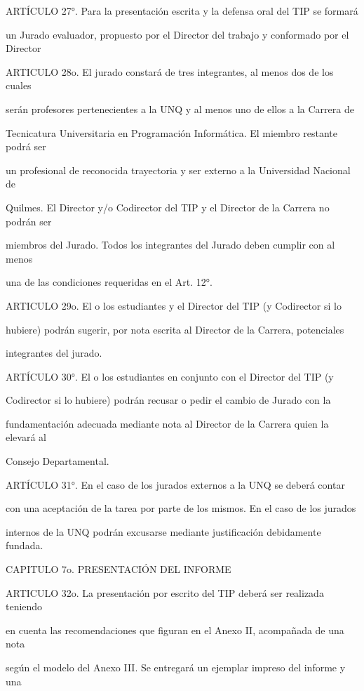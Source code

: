 \documentclass[a4paper,12pt]{article}
\begin{document}
ARTÍCULO 27°. Para la presentación escrita y la defensa oral del TIP se formará

un Jurado evaluador, propuesto por el Director del trabajo y conformado por el Director

ARTICULO 28o. El jurado constará de tres integrantes, al menos dos de los cuales

serán profesores pertenecientes a la UNQ y al menos uno de ellos a la Carrera de

Tecnicatura Universitaria en Programación Informática. El miembro restante podrá ser

un profesional de reconocida trayectoria y ser externo a la Universidad Nacional de

Quilmes. El Director y/o Codirector del TIP y el Director de la Carrera no podrán ser

miembros del Jurado. Todos los integrantes del Jurado deben cumplir con al menos

una de las condiciones requeridas en el Art. 12°.

ARTICULO 29o. El o los estudiantes y el Director del TIP (y Codirector si lo

hubiere) podrán sugerir, por nota escrita al Director de la Carrera, potenciales

integrantes del jurado.

ARTÍCULO 30°. El o los estudiantes en conjunto con el Director del TIP (y

Codirector si lo hubiere) podrán recusar o pedir el cambio de Jurado con la

fundamentación adecuada mediante nota al Director de la Carrera quien la elevará al

Consejo Departamental.

ARTÍCULO 31°. En el caso de los jurados externos a la UNQ se deberá contar

con una aceptación de la tarea por parte de los mismos. En el caso de los jurados

internos de la UNQ podrán excusarse mediante justificación debidamente fundada. 

CAPITULO 7o. PRESENTACIÓN DEL INFORME

ARTICULO 32o. La presentación por escrito del TIP deberá ser realizada teniendo

en cuenta las recomendaciones que figuran en el Anexo II, acompañada de una nota

según el modelo del Anexo III. Se entregará un ejemplar impreso del informe y una
\end{document}
